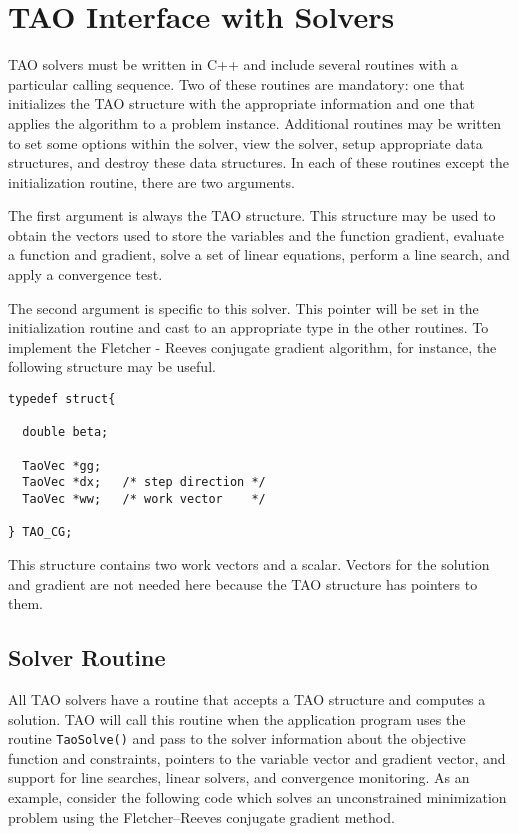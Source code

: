 \section{TAO Interface with Solvers}
TAO solvers must be written in C++ and include several routines with
a particular calling sequence.  Two of these routines are mandatory:
one that initializes the TAO structure with the appropriate information
and one that applies the algorithm to a problem instance.
Additional routines may be written to set some options within the
solver, view the solver, setup appropriate data structures, and destroy
these data structures.
In each of these routines except the initialization routine, 
there are two arguments.  

The first argument
is always the TAO structure.  This structure may be used to obtain the
vectors used to store the variables and the function gradient, evaluate
a function and gradient, solve a set of linear equations, perform a line 
search, and apply a convergence test.

The second argument is specific to this solver.  This pointer will be set
in  the initialization routine and cast to an appropriate type in
the other routines.  To implement the Fletcher - Reeves conjugate
gradient algorithm, for instance, the following structure may
be useful.
\begin{verbatim}
typedef struct{

  double beta;

  TaoVec *gg;
  TaoVec *dx;   /* step direction */
  TaoVec *ww;   /* work vector    */

} TAO_CG;
\end{verbatim}
This structure contains two work vectors and a scalar.  Vectors
for the solution and gradient are not needed here because the TAO
structure has pointers to them.

\subsection{Solver Routine}
All TAO solvers have a routine that accepts a TAO structure and
computes a solution.  
TAO will call this routine when the application
program uses the routine {\tt TaoSolve()} and pass to the solver
information
about the objective function and constraints, pointers to the
variable vector and gradient vector, and support for line searches,
linear solvers, and convergence monitoring.  As an example, consider
the following code which solves an unconstrained minimization problem
using the Fletcher--Reeves conjugate gradient method.

